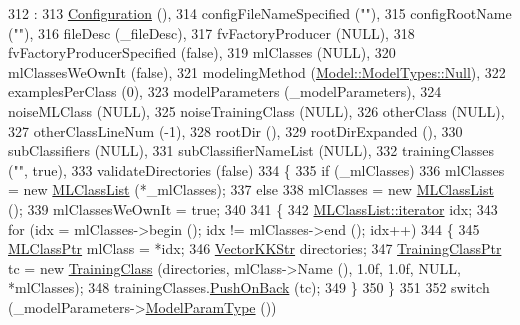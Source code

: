\begin{DoxyCode}
312                                                 :
313   \hyperlink{class_k_k_b_1_1_configuration_a779947337bf652f0e773cb29f37f14ba}{Configuration}              (),
314   configFileNameSpecified    (\textcolor{stringliteral}{""}),
315   configRootName             (\textcolor{stringliteral}{""}),
316   fileDesc                   (\_fileDesc),
317   fvFactoryProducer          (NULL),
318   fvFactoryProducerSpecified (\textcolor{keyword}{false}),
319   mlClasses                  (NULL),
320   mlClassesWeOwnIt           (\textcolor{keyword}{false}),
321   modelingMethod             (\hyperlink{class_k_k_m_l_l_1_1_model_aeda4060e088c67446ca993eefcecea06abbb93ef26e3c101ff11cdd21cab08a94}{Model::ModelTypes::Null}),
322   examplesPerClass           (0),
323   modelParameters            (\_modelParameters),
324   noiseMLClass               (NULL),
325   noiseTrainingClass         (NULL),
326   otherClass                 (NULL),
327   otherClassLineNum          (-1),
328   rootDir                    (),
329   rootDirExpanded            (),
330   subClassifiers             (NULL),
331   subClassifierNameList      (NULL),
332   trainingClasses            (\textcolor{stringliteral}{""}, \textcolor{keyword}{true}),
333   validateDirectories        (\textcolor{keyword}{false})
334 \{
335   \textcolor{keywordflow}{if}  (\_mlClasses)
336     mlClasses = \textcolor{keyword}{new} \hyperlink{class_k_k_m_l_l_1_1_m_l_class_list}{MLClassList} (*\_mlClasses);
337   \textcolor{keywordflow}{else}
338     mlClasses = \textcolor{keyword}{new} \hyperlink{class_k_k_m_l_l_1_1_m_l_class_list}{MLClassList} ();
339   mlClassesWeOwnIt = \textcolor{keyword}{true};
340 
341   \{
342     \hyperlink{class_k_k_b_1_1_k_k_queue_aa3c2796a726eea468b94132a9fbf2cfe}{MLClassList::iterator} idx;
343     \textcolor{keywordflow}{for}  (idx = mlClasses->begin ();  idx != mlClasses->end ();  idx++)
344     \{
345       \hyperlink{class_k_k_m_l_l_1_1_m_l_class}{MLClassPtr}      mlClass = *idx;
346       \hyperlink{class_k_k_b_1_1_vector_k_k_str}{VectorKKStr}  directories;
347       \hyperlink{class_k_k_m_l_l_1_1_training_class}{TrainingClassPtr}  tc = \textcolor{keyword}{new} \hyperlink{class_k_k_m_l_l_1_1_training_class}{TrainingClass} (directories, mlClass->Name (),
       1.0f, 1.0f, NULL, *mlClasses);
348       trainingClasses.\hyperlink{class_k_k_b_1_1_k_k_queue_aa9fba4632b54268bf71ecb42dee0b575}{PushOnBack} (tc);
349     \}
350   \}
351 
352   \textcolor{keywordflow}{switch}  (\_modelParameters->\hyperlink{class_k_k_m_l_l_1_1_model_param_a5242ed04961c16c12068f02044af20a8}{ModelParamType} ())

\end{DoxyCode}
